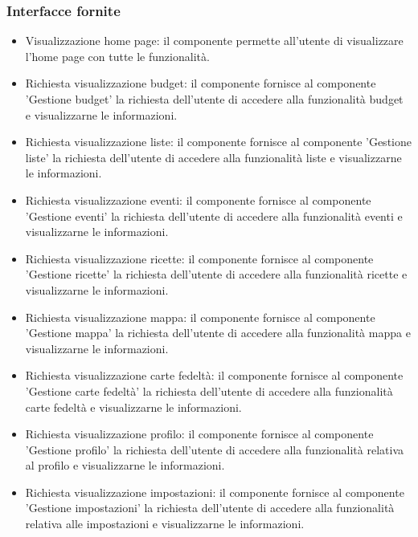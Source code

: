 \documentclass[a4paper,12pt]{article}
\begin{document}
\subsubsection*{Interfacce fornite}
\begin{itemize} \setlength\itemsep{0.01em}
\item {\sffamily Visualizzazione home page}: il componente permette all'utente di visualizzare l'home page con tutte le funzionalità.
\item {\sffamily Richiesta visualizzazione budget}: il componente fornisce al componente 'Gestione budget' la richiesta dell'utente di accedere alla funzionalità budget e visualizzarne le informazioni.
\item {\sffamily Richiesta visualizzazione liste}: il componente fornisce al componente 'Gestione liste' la richiesta dell'utente di accedere alla funzionalità liste e visualizzarne le informazioni.
\item {\sffamily Richiesta visualizzazione eventi}: il componente fornisce al componente 'Gestione eventi' la richiesta dell'utente di accedere alla funzionalità eventi e visualizzarne le informazioni.
\item {\sffamily Richiesta visualizzazione ricette}: il componente fornisce al componente 'Gestione ricette' la richiesta dell'utente di accedere alla funzionalità ricette e visualizzarne le informazioni.
\item {\sffamily Richiesta visualizzazione mappa}: il componente fornisce al componente 'Gestione mappa' la richiesta dell'utente di accedere alla funzionalità mappa e visualizzarne le informazioni.
\item {\sffamily Richiesta visualizzazione carte fedeltà}: il componente fornisce al componente 'Gestione carte fedeltà' la richiesta dell'utente di accedere alla funzionalità carte fedeltà e visualizzarne le informazioni.
\item {\sffamily Richiesta visualizzazione profilo}: il componente fornisce al componente 'Gestione profilo' la richiesta dell'utente di accedere alla funzionalità relativa al profilo e visualizzarne le informazioni.
\item {\sffamily Richiesta visualizzazione impostazioni}: il componente fornisce al componente 'Gestione impostazioni' la richiesta dell'utente di accedere alla funzionalità relativa alle impostazioni e visualizzarne le informazioni.
\end{itemize}
\end{document}
